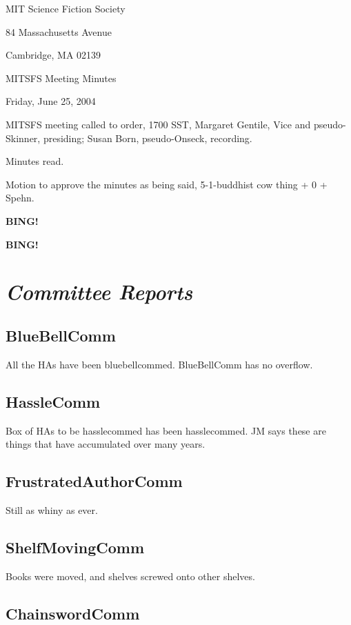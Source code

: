\documentclass[10pt]{article}
\newcommand{\bing}{{\bf BING!} }
\newcommand{\goto}[1]{\bing \vskip 12pt \section*{{\em{#1}}}}
\begin{document}
\begin{center}

MIT Science Fiction Society 

84 Massachusetts Avenue

Cambridge, MA 02139

\vspace{12pt}

MITSFS Meeting Minutes 

Friday, June 25, 2004

\end{center}
 
\vspace{18pt}

\setlength{\parskip}{6pt}

\noindent
MITSFS meeting called to order, 1700 SST, Margaret Gentile, Vice and
pseudo-Skinner, presiding; Susan Born,  pseudo-Onseck, recording.

Minutes read.

Motion to approve the minutes as being said, 5-1-buddhist cow thing +
0 + Spehn.

{\bing}

\goto{Committee Reports}
\subsection*{BlueBellComm}

All the HAs have been bluebellcommed.  BlueBellComm has no overflow.

\subsection*{HassleComm}

Box of HAs to be hasslecommed has been hasslecommed.  JM says these
are things that have accumulated over many years.

\subsection*{FrustratedAuthorComm}

Still as whiny as ever.

\subsection*{ShelfMovingComm}

Books were moved, and shelves screwed onto other shelves.

\subsection*{ChainswordComm}
\end{document}
